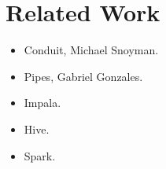 \clearpage{}
\section{Related Work}

\begin{itemize}
\item Conduit, Michael Snoyman.
\item Pipes, Gabriel Gonzales.
\item Impala.
\item Hive.
\item Spark.
\end{itemize}






